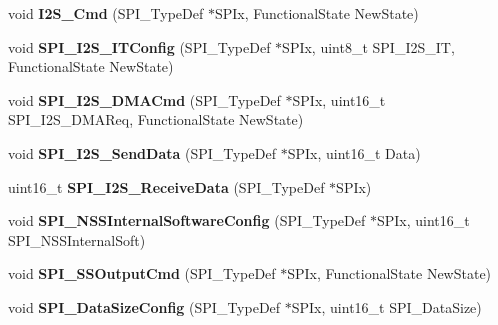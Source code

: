 \begin{DoxyCompactItemize}
\item 
\hypertarget{group__SPI__Exported__Functions_gafe061c71bbc5b4224f3f2884dc53739e}{
void {\bfseries I2S\_\-Cmd} (SPI\_\-TypeDef $\ast$SPIx, FunctionalState NewState)}
\label{group__SPI__Exported__Functions_gafe061c71bbc5b4224f3f2884dc53739e}

\item 
\hypertarget{group__SPI__Exported__Functions_ga17f4ef132e8ddbf94cb6b1688d181e41}{
void {\bfseries SPI\_\-I2S\_\-ITConfig} (SPI\_\-TypeDef $\ast$SPIx, uint8\_\-t SPI\_\-I2S\_\-IT, FunctionalState NewState)}
\label{group__SPI__Exported__Functions_ga17f4ef132e8ddbf94cb6b1688d181e41}

\item 
\hypertarget{group__SPI__Exported__Functions_gabed5b91a8576e6d578f364cc0e807e4a}{
void {\bfseries SPI\_\-I2S\_\-DMACmd} (SPI\_\-TypeDef $\ast$SPIx, uint16\_\-t SPI\_\-I2S\_\-DMAReq, FunctionalState NewState)}
\label{group__SPI__Exported__Functions_gabed5b91a8576e6d578f364cc0e807e4a}

\item 
\hypertarget{group__SPI__Exported__Functions_gad5af40bebe8dbe3fa8bd476489d7e3da}{
void {\bfseries SPI\_\-I2S\_\-SendData} (SPI\_\-TypeDef $\ast$SPIx, uint16\_\-t Data)}
\label{group__SPI__Exported__Functions_gad5af40bebe8dbe3fa8bd476489d7e3da}

\item 
\hypertarget{group__SPI__Exported__Functions_gab77de76547f3bff403236b263b070a30}{
uint16\_\-t {\bfseries SPI\_\-I2S\_\-ReceiveData} (SPI\_\-TypeDef $\ast$SPIx)}
\label{group__SPI__Exported__Functions_gab77de76547f3bff403236b263b070a30}

\item 
\hypertarget{group__SPI__Exported__Functions_ga56fc508a482f032f9eb80e4c63184126}{
void {\bfseries SPI\_\-NSSInternalSoftwareConfig} (SPI\_\-TypeDef $\ast$SPIx, uint16\_\-t SPI\_\-NSSInternalSoft)}
\label{group__SPI__Exported__Functions_ga56fc508a482f032f9eb80e4c63184126}

\item 
\hypertarget{group__SPI__Exported__Functions_ga4ec54abdedf6cd17403d853a926d91c1}{
void {\bfseries SPI\_\-SSOutputCmd} (SPI\_\-TypeDef $\ast$SPIx, FunctionalState NewState)}
\label{group__SPI__Exported__Functions_ga4ec54abdedf6cd17403d853a926d91c1}

\item 
\hypertarget{group__SPI__Exported__Functions_gafc82e90841d7879535d655c035709cb1}{
void {\bfseries SPI\_\-DataSizeConfig} (SPI\_\-TypeDef $\ast$SPIx, uint16\_\-t SPI\_\-DataSize)}
\label{group__SPI__Exported__Functions_gafc82e90841d7879535d655c035709cb1}


\end{DoxyCompactItemize}
